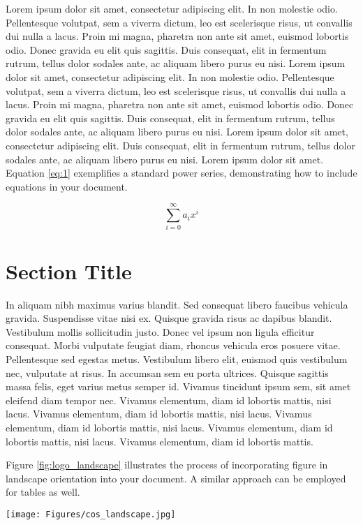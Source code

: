 Lorem ipsum dolor sit amet, consectetur adipiscing elit. In non molestie odio. Pellentesque volutpat, sem a viverra dictum, leo est scelerisque risus, ut convallis dui nulla a lacus. Proin mi magna, pharetra non ante sit amet, euismod lobortis odio. Donec gravida eu elit quis sagittis. Duis consequat, elit in fermentum rutrum, tellus dolor sodales ante, ac aliquam libero purus eu nisi. Lorem ipsum dolor sit amet, consectetur adipiscing elit. In non molestie odio. Pellentesque volutpat, sem a viverra dictum, leo est scelerisque risus, ut convallis dui nulla a lacus. Proin mi magna, pharetra non ante sit amet, euismod lobortis odio. Donec gravida eu elit quis sagittis. Duis consequat, elit in fermentum rutrum, tellus dolor sodales ante, ac aliquam libero purus eu nisi. Lorem ipsum dolor sit amet, consectetur adipiscing elit. Duis consequat, elit in fermentum rutrum, tellus dolor sodales ante, ac aliquam libero purus eu nisi. Lorem ipsum dolor sit amet. Equation \ref{eq:1} exemplifies a standard power series, demonstrating how to include equations in your document.

\begin{equation} \label{eq:1}
\sum_{i=0}^{\infty} a_i x^i
\end{equation}


\section{Section Title}
In aliquam nibh maximus varius blandit. Sed consequat libero faucibus vehicula gravida. Suspendisse vitae nisi ex. Quisque gravida risus ac dapibus blandit. Vestibulum mollis sollicitudin justo. Donec vel ipsum non ligula efficitur consequat. Morbi vulputate feugiat diam, rhoncus vehicula eros posuere vitae. Pellentesque sed egestas metus. Vestibulum libero elit, euismod quis vestibulum nec, vulputate at risus. In accumsan sem eu porta ultrices. Quisque sagittis massa felis, eget varius metus semper id. Vivamus tincidunt ipsum sem, sit amet eleifend diam tempor nec. Vivamus elementum, diam id lobortis mattis, nisi lacus. Vivamus elementum, diam id lobortis mattis, nisi lacus. Vivamus elementum, diam id lobortis mattis, nisi lacus. Vivamus elementum, diam id lobortis mattis, nisi lacus.  Vivamus elementum, diam id lobortis mattis. 

Figure \ref{fig:logo_landscape} illustrates the process of incorporating figure in landscape orientation into your document. A similar approach can be employed for tables as well.

\begin{sidewaysfigure}[htbp]
\texttt{[image: Figures/cos\_landscape.jpg]}
\caption[The short figure caption goes here.]{The full figure caption goes here. Please describe the figure and figure legends here.}
\label{fig:logo_landscape}
\end{sidewaysfigure}

